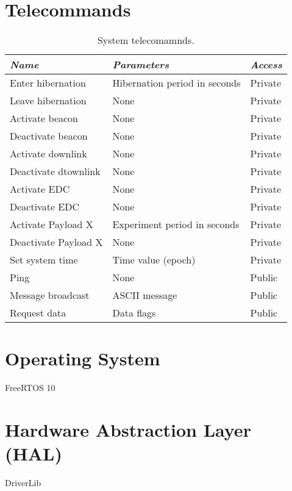 \section{Telecommands}

\begin{table}[!h]
    \centering
    \begin{tabular}{lll}
        \toprule[1.5pt]
        \textit{Name}          & \textit{Parameters}           & \textit{Access} \\
        \midrule
        Enter hibernation      & Hibernation period in seconds & Private         \\
        Leave hibernation      & None                          & Private         \\
        Activate beacon        & None                          & Private         \\
        Deactivate beacon      & None                          & Private         \\
        Activate downlink      & None                          & Private         \\
        Deactivate dtownlink   & None                          & Private         \\
        Activate EDC           & None                          & Private         \\
        Deactivate EDC         & None                          & Private         \\
        Activate Payload X     & Experiment period in seconds  & Private         \\
        Deactivate Payload X   & None                          & Private         \\
        Set system time        & Time value (epoch)            & Private         \\
        Ping                   & None                          & Public          \\
        Message broadcast      & ASCII message                 & Public          \\
        Request data           & Data flags                    & Public          \\
        \bottomrule[1.5pt]
    \end{tabular}
    \caption{System telecomamnds.}
    \label{tab:system-telecommands}
\end{table}

\section{Operating System}

FreeRTOS 10

\section{Hardware Abstraction Layer (HAL)}

DriverLib
